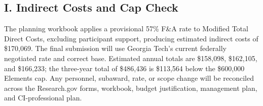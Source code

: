 \subsection*{I. Indirect Costs and Cap Check}

The planning workbook applies a provisional 57\% F\&A rate to Modified Total
Direct Costs, excluding participant support, producing estimated indirect
costs of \$170,069. The final submission will use Georgia Tech's current
federally negotiated rate and correct base. Estimated annual totals are
\$158,098, \$162,105, and \$166,233; the three-year total of \$486,436 is
\$113,564 below the \$600,000 Elements cap. Any personnel, subaward, rate, or
scope change will be reconciled across the Research.gov forms, workbook,
budget justification, management plan, and CI-professional plan.
